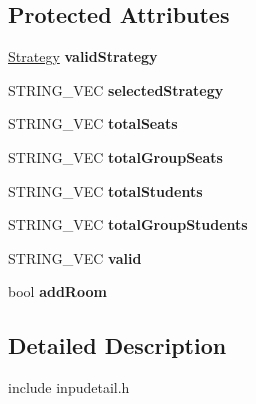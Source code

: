 \subsection*{\-Protected \-Attributes}
\begin{DoxyCompactItemize}
\item 
\hypertarget{classValidStrategy_aac23ca61c16d79b48603a7db96617003}{\hyperlink{classStrategy}{\-Strategy} {\bfseries valid\-Strategy}}\label{classValidStrategy_aac23ca61c16d79b48603a7db96617003}

\item 
\hypertarget{classValidStrategy_a0400bdc1d25df2a613d50ed02c537eb2}{\-S\-T\-R\-I\-N\-G\-\_\-\-V\-E\-C {\bfseries selected\-Strategy}}\label{classValidStrategy_a0400bdc1d25df2a613d50ed02c537eb2}

\item 
\hypertarget{classValidStrategy_ad34fa679672d7685af9678e6c579e800}{\-S\-T\-R\-I\-N\-G\-\_\-\-V\-E\-C {\bfseries total\-Seats}}\label{classValidStrategy_ad34fa679672d7685af9678e6c579e800}

\item 
\hypertarget{classValidStrategy_a7344a7cf32192fa494ed9dd6784c509e}{\-S\-T\-R\-I\-N\-G\-\_\-\-V\-E\-C {\bfseries total\-Group\-Seats}}\label{classValidStrategy_a7344a7cf32192fa494ed9dd6784c509e}

\item 
\hypertarget{classValidStrategy_a4d0e361e6ed28a83332bebf66ab018e2}{\-S\-T\-R\-I\-N\-G\-\_\-\-V\-E\-C {\bfseries total\-Students}}\label{classValidStrategy_a4d0e361e6ed28a83332bebf66ab018e2}

\item 
\hypertarget{classValidStrategy_a4d947570307ce9d87d35f699ee10cae6}{\-S\-T\-R\-I\-N\-G\-\_\-\-V\-E\-C {\bfseries total\-Group\-Students}}\label{classValidStrategy_a4d947570307ce9d87d35f699ee10cae6}

\item 
\hypertarget{classValidStrategy_a66d7ba02a423a08f4f0af7c714787e76}{\-S\-T\-R\-I\-N\-G\-\_\-\-V\-E\-C {\bfseries valid}}\label{classValidStrategy_a66d7ba02a423a08f4f0af7c714787e76}

\item 
\hypertarget{classValidStrategy_aa18f4ff7dd65ed5702148c192f8627a6}{bool {\bfseries add\-Room}}\label{classValidStrategy_aa18f4ff7dd65ed5702148c192f8627a6}

\end{DoxyCompactItemize}


\subsection{\-Detailed \-Description}
include inpudetail.\-h 


